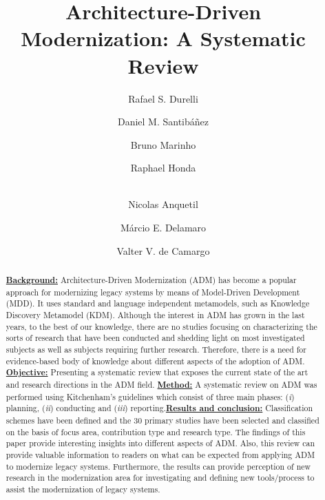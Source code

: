 \documentclass{llncs}
\begin{document}
\title{Architecture-Driven Modernization: A Systematic Review}


\author{Rafael S. Durelli 
\and Daniel M. Santib\'{a}\~{n}ez \and Bruno Marinho \and Raphael Honda\and\\
Nicolas Anquetil\and M\'{a}rcio E. Delamaro \and Valter V. de Camargo}



\maketitle

\begin{abstract}

\underline{\textbf{Background:}} Architecture-Driven Modernization (ADM) has become a popular approach for modernizing legacy systems by means of Model-Driven Development (MDD). It uses standard and language independent metamodels, such as Knowledge Discovery Metamodel (KDM). Although the interest in ADM has grown in the last years, to the best of our knowledge, there are no studies focusing on characterizing the sorts of research that have been conducted and shedding light on most investigated subjects as well as subjects requiring further research. Therefore, there is a need for evidence-based body of knowledge about different aspects of the adoption of ADM. \underline{\textbf{Objective:}} Presenting a systematic review that exposes the current state of the art and research directions in the ADM field. \underline{\textbf{Method:}} A systematic review on ADM was performed using Kitchenham's guidelines which consist of three main phases: (\textit{i}) planning, (\textit{ii}) conducting and (\textit{iii}) reporting.\underline{\textbf{Results and conclusion:}} Classification schemes have been defined and the 30 primary studies have been selected and classified on the basis of focus area, contribution type and research type. The findings of this paper provide interesting insights into different aspects of ADM. Also, this review can provide valuable information to readers on what can be expected from applying ADM to modernize legacy systems. Furthermore, the results can provide perception of new research in the modernization area for investigating and defining new tools/process to assist the modernization of legacy systems.

\end{abstract}
\end{document}
